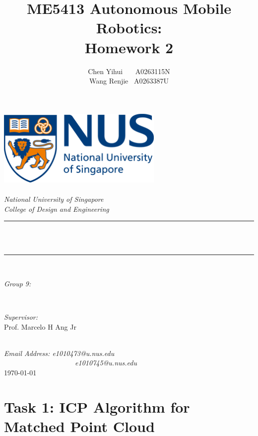 \documentclass[hyperref]{article}
\title{ME5413 Autonomous Mobile Robotics: \\ Homework 2}
\author{\textup{Chen Yihui \ \ \ A0263115N \\ Wang Renjie \ A0263387U }}
\theoremstyle{nonumberplain}
\begin{document}
	\begin{titlepage}
		\center
		\newcommand{\HRule}{\rule{\linewidth}{0.5mm}}
		\includegraphics[width=8cm]{logo.png}\\[1cm] 
		\quad\\[2cm]
		\textsl{\Large National University of Singapore}\\[0.5cm] 
		\textsl{\large College of Design and Engineering}\\[0.5cm]
		\makeatletter
		\HRule \\[0.4cm]
		{ \huge \bfseries \@title}\\[0.4cm] 
		\HRule \\[2cm]
		\begin{minipage}{0.4\textwidth}
			\begin{flushleft} \large
				\emph{Group 9:}\\
				\@author 
			\end{flushleft}
		\end{minipage}
		~
		\begin{minipage}{0.4\textwidth}
			\begin{flushright} \large
				\emph{Supervisor:} \\
				\textup{Prof. Marcelo H Ang Jr}
			\end{flushright}
		\end{minipage}\\[3cm]
		\makeatother
		{\large \emph{Email Address: e1010473@u.nus.edu \\	\ \ \ \ \ \ \ \ \ \ \ \ \ \ \ \ \ \ \ \ e1010745@u.nus.edu}}\\[0.5cm]
		{\large \today}\\[2cm] 
		\vfill 
	\end{titlepage}

\section{Task 1: ICP Algorithm for Matched Point Cloud}

\hspace{1.0em}
\end{document}
